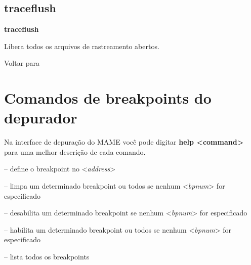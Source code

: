 \documentclass[letterpaper,10pt,brazil]{sphinxmanual}
\begin{document}
\subsection{traceflush}
\label{debugger/execution:traceflush}\label{debugger/execution:debugger-command-traceflush}
\begin{DUlineblock}{0em}
\item[]
\begin{DUlineblock}{\DUlineblockindent}
\item[] \textbf{traceflush}
\item[] 
\end{DUlineblock}
\item[] Libera todos os arquivos de rastreamento abertos.
\item[] 
\item[] Voltar para {\hyperref[debugger/execution:debugger\string-execution\string-list]{}}
\end{DUlineblock}


\section{Comandos de breakpoints do depurador}
\label{debugger/breakpoint:debugger-breakpoint-list}\label{debugger/breakpoint::doc}\label{debugger/breakpoint:comandos-de-breakpoints-do-depurador}
Na interface de depuração do MAME você pode digitar \textbf{help \textless{}command\textgreater{}}
para uma melhor descrição de cada comando.

\begin{DUlineblock}{0em}
\item[] {\hyperref[debugger/breakpoint:debugger\string-command\string-bpset]{}} -- define o breakpoint no \textless{}\emph{address}\textgreater{}
\item[] {\hyperref[debugger/breakpoint:debugger\string-command\string-bpclear]{}} -- limpa um determinado breakpoint ou todos se nenhum \textless{}\emph{bpnum}\textgreater{} for especificado
\item[] {\hyperref[debugger/breakpoint:debugger\string-command\string-bpdisable]{}} -- desabilita um determinado breakpoint se nenhum \textless{}\emph{bpnum}\textgreater{} for especificado
\item[] {\hyperref[debugger/breakpoint:debugger\string-command\string-bpenable]{}} -- habilita um determinado breakpoint ou todos se nenhum \textless{}\emph{bpnum}\textgreater{} for especificado
\item[] {\hyperref[debugger/breakpoint:debugger\string-command\string-bplist]{}} -- lista todos os breakpoints
\end{DUlineblock}
\begin{quote}
\label{debugger/breakpoint:debugger-command-bpset}\end{quote}
\end{document}
